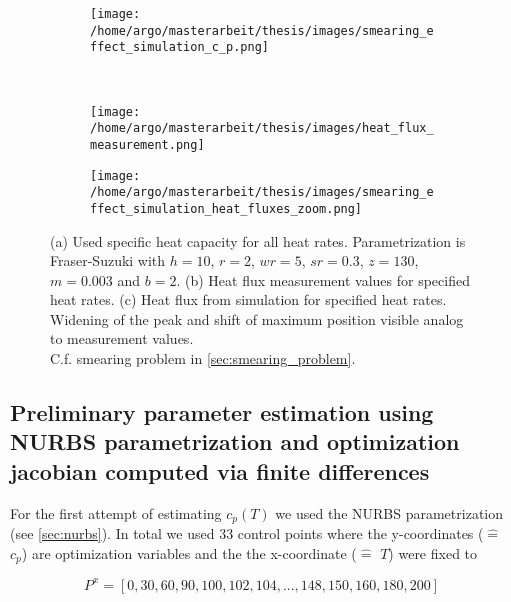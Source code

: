 \documentclass{scrartcl}[12pt, halfparskip]
\numberwithin{equation}{section}
\numberwithin{figure}{section}
\numberwithin{table}{section}
\begin{document}
\begin{figure}[H]
	\centering
	\begin{subfigure}{0.9\textwidth}
		\centering
		\texttt{[image: /home/argo/masterarbeit/thesis/images/smearing\_effect\_simulation\_c\_p.png]}
		\caption{}
		\label{fig:smearing_effect_c_p}
	\end{subfigure} \\
	\begin{subfigure}{0.49\textwidth}
		\texttt{[image: /home/argo/masterarbeit/thesis/images/heat\_flux\_measurement.png]}
		\caption{}
		\label{fig:smearing_effect_measurement_heat_flux}
	\end{subfigure}
	\begin{subfigure}{0.49\textwidth}
		\texttt{[image: /home/argo/masterarbeit/thesis/images/smearing\_effect\_simulation\_heat\_fluxes\_zoom.png]}
		\caption{}
		\label{fig:smearing_effect_simulation_heat_flux}
	\end{subfigure}
	\caption{(a) Used specific heat capacity for all heat rates. Parametrization is Fraser-Suzuki with $h=10$, $r=2$, $wr=5$, $sr=0.3$, $z=130$, $m=0.003$ and $b=2$. (b) Heat flux measurement values for specified heat rates. (c) Heat flux from simulation for specified heat rates. Widening of the peak and shift of maximum position visible analog to measurement values. \\
	C.f. smearing problem in \cref{sec:smearing_problem}.}
\end{figure}



\subsection{Preliminary parameter estimation using NURBS parametrization and optimization jacobian computed via finite differences}
\label{sec:param_estim_NURBS}

For the first attempt of estimating $c_p(T)$  we used the NURBS parametrization (see \cref{sec:nurbs}). In total we used 33 control points where the y-coordinates ($\hat{=}$ $c_p$) are optimization variables and the the x-coordinate ($\hat{=}$ $T$) were fixed to 

\begin{equation}
	P^x = [0, 30, 60, 90, 100, 102, 104, ..., 148, 150, 160, 180, 200]
\end{equation}
\end{document}
